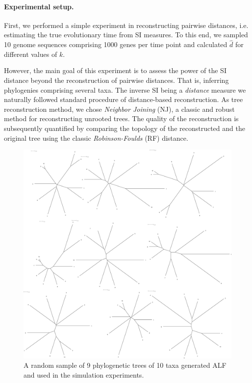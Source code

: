 \documentclass[9pt,english,utf8]{article}
\begin{document}
\paragraph{Experimental setup.}
First, we performed a simple experiment in reconstructing pairwise distances,
i.e.  estimating the true evolutionary time from SI measures. To this end, we
sampled 10 genome sequences comprising 1000 genes per time point and calculated
$\hat d$ for different values of $k$.  

However, the main goal of this experiment is to assess the power of the SI
distance beyond the reconstruction of pairwise distances. That is, inferring
phylogenies comprising several taxa. The inverse SI being a \emph{distance}
measure we naturally followed standard procedure of distance-based
reconstruction. As tree reconstruction method, we chose \emph{Neighbor
Joining} (NJ), a classic and robust method for reconstructing unrooted trees.
The quality of the reconstruction is subsequently quantified by comparing the
topology of the reconstructed and the original tree using the classic
\emph{Robinson-Foulds} (RF) distance.  

\begin{figure}[tb]
    \centering \includegraphics[width=\columnwidth]{true_trees_s10_pam10}

    \caption{A random sample of 9 phylogenetic trees of 10 taxa generated ALF
    and used in the simulation experiments.}
    \label{fig:tree}
\end{figure}
\end{document}
